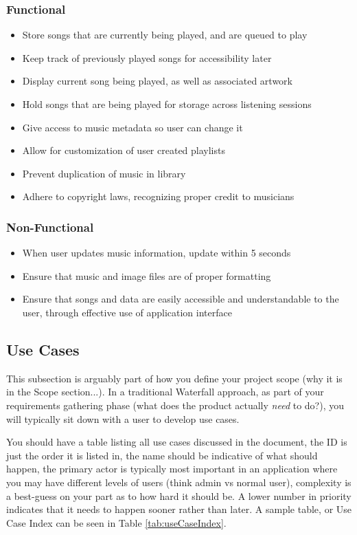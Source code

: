 \documentclass[10pt,conference,onecolumn,compsoc]{IEEEtran}
\begin{document}
\subsubsection{Functional}
\begin{itemize}
\item Store songs that are currently being played, and are queued to play
\item Keep track of previously played songs for accessibility later
\item Display current song being played, as well as associated artwork
\item Hold songs that are being played for storage across listening sessions
\item Give access to music metadata so user can change it
\item Allow for customization of user created playlists
\item Prevent duplication of music in library
\item Adhere to copyright laws, recognizing proper credit to musicians 
\end{itemize}

\subsubsection{Non-Functional}
\begin{itemize}
\item When user updates music information, update within 5 seconds
\item Ensure that music and image files are of proper formatting
\item Ensure that songs and data are easily accessible and understandable to the user, through effective use of application interface
\end{itemize}

\subsection{Use Cases}
This subsection is arguably part of how you define your project scope (why it is in the Scope section...).  In a traditional Waterfall approach, as part of your requirements gathering phase (what does the product actually \emph{need} to do?), you will typically sit down with a user to develop use cases.

You should have a table listing all use cases discussed in the document, the ID is just the order it is listed in, the name should be indicative of what should happen, the primary actor is typically most important in an application where you may have different levels of users (think admin vs normal user), complexity is a best-guess on your part as to how hard it should be.  A lower number in priority indicates that it needs to happen sooner rather than later.  A sample table, or Use Case Index can be seen in Table \ref{tab:useCaseIndex}.
\end{document}
